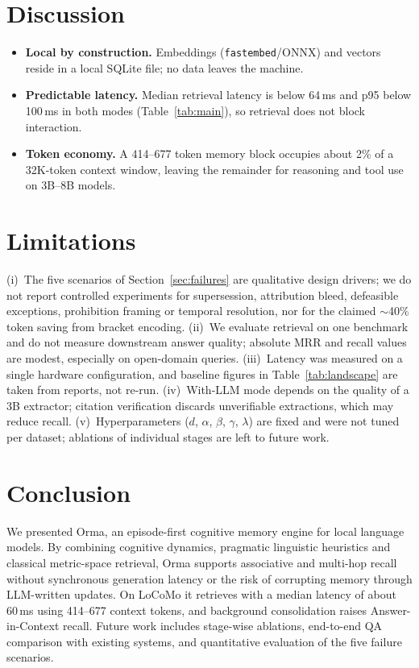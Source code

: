 \documentclass[11pt]{article}
\newcommand{\orma}{\mbox{Orma}}
\begin{document}
\section{Discussion}
\label{sec:discussion}
\begin{itemize}
    \item \textbf{Local by construction.} Embeddings (\texttt{fastembed}/ONNX) and vectors reside in a local SQLite file; no data leaves the machine.
    \item \textbf{Predictable latency.} Median retrieval latency is below 64\,ms and p95 below 100\,ms in both modes (Table~\ref{tab:main}), so retrieval does not block interaction.
    \item \textbf{Token economy.} A 414--677 token memory block occupies about 2\% of a 32K-token context window, leaving the remainder for reasoning and tool use on 3B--8B models.
\end{itemize}

\section{Limitations}
\label{sec:limits}
(i)~The five scenarios of Section~\ref{sec:failures} are qualitative design drivers; we do not report controlled experiments for supersession, attribution bleed, defeasible exceptions, prohibition framing or temporal resolution, nor for the claimed $\sim$40\% token saving from bracket encoding.
(ii)~We evaluate retrieval on one benchmark and do not measure downstream answer quality; absolute MRR and recall values are modest, especially on open-domain queries.
(iii)~Latency was measured on a single hardware configuration, and baseline figures in Table~\ref{tab:landscape} are taken from reports, not re-run.
(iv)~With-LLM mode depends on the quality of a 3B extractor; citation verification discards unverifiable extractions, which may reduce recall.
(v)~Hyperparameters ($d$, $\alpha$, $\beta$, $\gamma$, $\lambda$) are fixed and were not tuned per dataset; ablations of individual stages are left to future work.

\section{Conclusion}
\label{sec:conclusion}
We presented \orma, an episode-first cognitive memory engine for local language models. By combining cognitive dynamics, pragmatic linguistic heuristics and classical metric-space retrieval, \orma{} supports associative and multi-hop recall without synchronous generation latency or the risk of corrupting memory through LLM-written updates. On LoCoMo it retrieves with a median latency of about 60\,ms using 414--677 context tokens, and background consolidation raises Answer-in-Context recall. Future work includes stage-wise ablations, end-to-end QA comparison with existing systems, and quantitative evaluation of the five failure scenarios.
\end{document}

